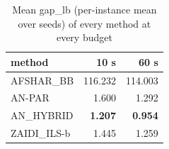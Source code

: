 \begin{table}[htbp]
\centering
\small
\caption{Mean gap\_lb (per-instance mean over seeds) of every method at every budget}
\label{tab:state_of_the_art_10s_to_60s_gap_by_budget}
\begin{tabular}{lrr}
\toprule
method & 10 s & 60 s \\
\midrule
AFSHAR\_BB & 116.232 & 114.003 \\
AN-PAR & 1.600 & 1.292 \\
AN\_HYBRID & \textbf{1.207} & \textbf{0.954} \\
ZAIDI\_ILS-b & 1.445 & 1.259 \\
\bottomrule
\end{tabular}
\end{table}
